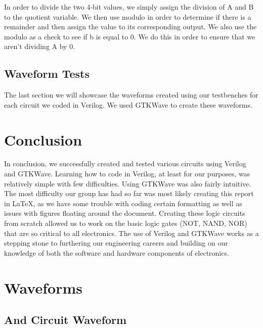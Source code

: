 \documentclass[12pt]{article}
\begin{document}
In order to divide the two 4-bit values, we simply assign the division of A and B to the quotient variable. We then use modulo in order to determine if there is a remainder and then assign the value to its corresponding output. We also use the modulo as a check to see if b is equal to 0. We do this in order to ensure that we aren't dividing A by 0.





\subsection{Waveform Tests}

The last section we will showcase the waveforms created using our testbenches for each circuit we coded in Verilog. We used GTKWave to create these waveforms.







\section{Conclusion}

In conclusion, we successfully created and tested various circuits using Verilog and GTKWave. Learning how to code in Verilog, at least for our purposes, was relatively simple with few difficulties. Using GTKWave was also fairly intuitive. The most difficulty our group has had so far was most likely creating this report in LaTeX, as we have some trouble with coding certain formatting as well as issues with figures floating around the document. Creating these logic circuits from scratch allowed us to work on the basic logic gates (NOT, NAND, NOR) that are so critical to all electronics. The use of Verilog and GTKWave works as a stepping stone to furthering our engineering careers and building on our knowledge of both the software and hardware components of electronics.


\newpage

\section{Waveforms}



\subsection{And Circuit Waveform}
\end{document}
